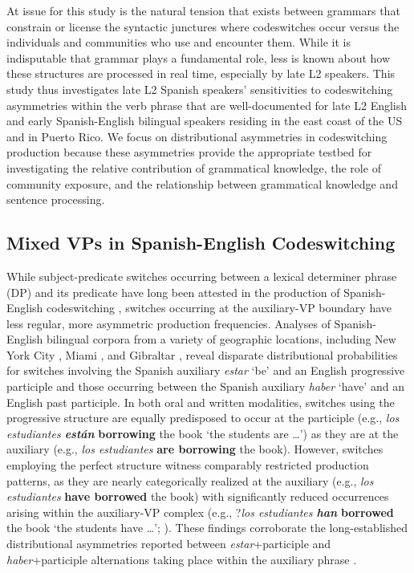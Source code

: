 \documentclass[output=paper,colorlinks,citecolor=brown]{langscibook}
\begin{document}
At issue for this study is the natural tension that exists between grammars that constrain or license the syntactic junctures where codeswitches occur versus the individuals and communities who use and encounter them. While it is indisputable that grammar plays a fundamental role, less is known about how these structures are processed in real time, especially by late L2 speakers. This study thus investigates late L2 Spanish speakers’ sensitivities to codeswitching asymmetries within the verb phrase that are well-documented for late L2 English and early Spanish-English bilingual speakers residing in the east coast of the US and in Puerto Rico. We focus on distributional asymmetries in codeswitching production because these asymmetries provide the appropriate testbed for investigating the relative contribution of grammatical knowledge, the role of community exposure, and the relationship between grammatical knowledge and sentence processing.

\subsection{Mixed VPs in Spanish-English Codeswitching}
While subject-predicate switches occurring between a lexical determiner phrase (DP) and its predicate have long been attested in the production of Spanish-English codeswitching \citep{Poplack1980}, switches occurring at the auxiliary-VP boundary have less regular, more asymmetric production frequencies. Analyses of Spanish-English bilingual corpora from a variety of geographic locations, including New York City \citep{Poplack1980}, Miami \citep{Deucharetal2014}, and Gibraltar \citep{GuzzardoTamargoetal2016}, reveal disparate distributional probabilities for switches involving the Spanish auxiliary \textit{estar} ‘be’ and an English progressive participle and those occurring between the Spanish auxiliary \textit{haber} ‘have’ and an English past participle. In both oral and written modalities, switches using the progressive structure are equally predisposed to occur at the participle (e.g., \textit{los estudiantes \textbf{est\'an}} \textbf{borrowing} the book `the students are \ldots') as they are at the auxiliary (e.g., \textit{los estudiantes} \textbf{are borrowing} the book). However, switches employing the perfect structure witness comparably restricted production patterns, as they are nearly categorically realized at the auxiliary (e.g., \textit{los estudiantes} \textbf{have borrowed} the book) with significantly reduced occurrences arising within the auxiliary-VP complex (e.g., ?\textit{los estudiantes \textbf{han}} \textbf{borrowed} the book `the students have \ldots'; \cite{GuzzardoTamargoetal2016}). These findings corroborate the long-established distributional asymmetries reported between \textit{estar}+participle and \textit{haber}+participle alternations taking place within the auxiliary phrase \citep{Lipski1978,Lipski1985,Pfaff1979,Poplack1980}.
\end{document}

